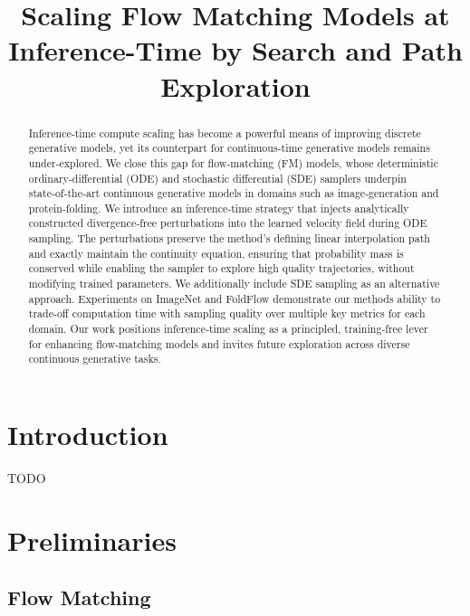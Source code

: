 \documentclass{article}
\title{Scaling Flow Matching Models at Inference-Time by Search and Path Exploration}
\begin{document}
\maketitle


\begin{abstract}
Inference‑time compute scaling has become a powerful means of improving discrete generative models, yet its counterpart for continuous‑time generative models remains under‑explored. We close this gap for flow‑matching (FM) models, whose deterministic ordinary‑differential (ODE) and stochastic differential (SDE) samplers underpin state‑of‑the‑art continuous generative models in domains such as image‑generation and protein‑folding. We introduce an inference‑time strategy that injects analytically constructed divergence‑free perturbations into the learned velocity field during ODE sampling. The perturbations preserve the method's defining linear interpolation path and exactly maintain the continuity equation, ensuring that probability mass is conserved while enabling the sampler to explore high quality trajectories, without modifying trained parameters. We additionally include SDE sampling as an alternative approach. Experiments on ImageNet and FoldFlow demonstrate our methods ability to trade-off computation time with sampling quality over multiple key metrics for each domain. Our work positions inference‑time scaling as a principled, training‑free lever for enhancing flow‑matching models and invites future exploration across diverse continuous generative tasks.
\end{abstract}


\section{Introduction}

TODO


\section{Preliminaries}
\label{sec:preliminaries}

\subsection{Flow Matching}
\end{document}
